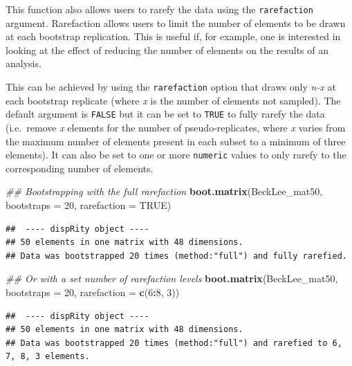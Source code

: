 \documentclass[
]{book}
\newenvironment{Shaded}{\begin{snugshade}}{\end{snugshade}}
\newcommand{\CommentTok}[1]{\textcolor[rgb]{0.56,0.35,0.01}{\textit{#1}}}
\newcommand{\DataTypeTok}[1]{\textcolor[rgb]{0.13,0.29,0.53}{#1}}
\newcommand{\DecValTok}[1]{\textcolor[rgb]{0.00,0.00,0.81}{#1}}
\newcommand{\KeywordTok}[1]{\textcolor[rgb]{0.13,0.29,0.53}{\textbf{#1}}}
\newcommand{\NormalTok}[1]{#1}
\newcommand{\OperatorTok}[1]{\textcolor[rgb]{0.81,0.36,0.00}{\textbf{#1}}}
\newcommand{\OtherTok}[1]{\textcolor[rgb]{0.56,0.35,0.01}{#1}}
\begin{document}
This function also allows users to rarefy the data using the \texttt{rarefaction} argument.
Rarefaction allows users to limit the number of elements to be drawn at each bootstrap replication.
This is useful if, for example, one is interested in looking at the effect of reducing the number of elements on the results of an analysis.

This can be achieved by using the \texttt{rarefaction} option that draws only \emph{n-x} at each bootstrap replicate (where \emph{x} is the number of elements not sampled).
The default argument is \texttt{FALSE} but it can be set to \texttt{TRUE} to fully rarefy the data (i.e.~remove \emph{x} elements for the number of pseudo-replicates, where \emph{x} varies from the maximum number of elements present in each subset to a minimum of three elements).
It can also be set to one or more \texttt{numeric} values to only rarefy to the corresponding number of elements.

\begin{Shaded}
\begin{Highlighting}[]
\CommentTok{\#\# Bootstrapping with the full rarefaction}
\KeywordTok{boot.matrix}\NormalTok{(BeckLee\_mat50, }\DataTypeTok{bootstraps =} \DecValTok{20}\NormalTok{,}
            \DataTypeTok{rarefaction =} \OtherTok{TRUE}\NormalTok{)}
\end{Highlighting}
\end{Shaded}

\begin{verbatim}
##  ---- dispRity object ---- 
## 50 elements in one matrix with 48 dimensions.
## Data was bootstrapped 20 times (method:"full") and fully rarefied.
\end{verbatim}

\begin{Shaded}
\begin{Highlighting}[]
\CommentTok{\#\# Or with a set number of rarefaction levels}
\KeywordTok{boot.matrix}\NormalTok{(BeckLee\_mat50, }\DataTypeTok{bootstraps =} \DecValTok{20}\NormalTok{,}
            \DataTypeTok{rarefaction =} \KeywordTok{c}\NormalTok{(}\DecValTok{6}\OperatorTok{:}\DecValTok{8}\NormalTok{, }\DecValTok{3}\NormalTok{))}
\end{Highlighting}
\end{Shaded}

\begin{verbatim}
##  ---- dispRity object ---- 
## 50 elements in one matrix with 48 dimensions.
## Data was bootstrapped 20 times (method:"full") and rarefied to 6, 7, 8, 3 elements.
\end{verbatim}
\end{document}
